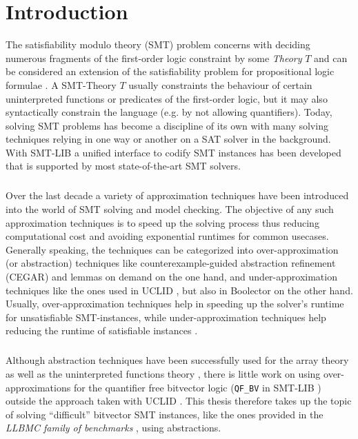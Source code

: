 \chapter{Introduction}
\label{ch:introduction}
The satisfiability modulo theory (SMT) problem concerns with deciding numerous fragments of the first-order logic constraint by some \textit{Theory} $T$ \cite{Barrett-Tinelli-SMT} and can be considered an extension of the satisfiability problem for propositional logic formulae \cite{Marques-Silva-PropositionalSATSolving}.
A SMT-Theory $T$ usually constraints the behaviour of certain uninterpreted functions or predicates of the first-order logic, but it may also syntactically constrain the language (e.g. by not allowing quantifiers).
Today, solving SMT problems has become a discipline of its own with many solving techniques relying in one way or another on a SAT solver in the background.
With SMT-LIB \cite{BarFT-SMTLIB} a unified interface to codify SMT instances has been developed that is supported by most state-of-the-art SMT solvers.
\paragraph{}
Over the last decade a variety of approximation techniques have been introduced into the world of SMT solving and model checking.
The objective of any such approximation techniques is to speed up the solving process thus reducing computational cost and avoiding exponential runtimes for common usecases.
Generally speaking, the techniques can be categorized into over-approximation (or abstraction) techniques like counterexample-guided abstraction refinement (CEGAR) \cite{CEGAR} and lemmas on demand \cite{p6-brummayer} on the one hand, and under-approximation techniques like the ones used in UCLID \cite{Bryant2007_Chapter_DecidingBit-VectorArithmeticWi-UCLID}, but also in Boolector \cite{NiemetzPreinerBiere-JSAT15} on the other hand.
Usually, over-approximation techniques help in speeding up the solver's runtime for unsatisfiable SMT-instances, while under-approximation techniques help reducing the runtime of satisfiable instances \cite{Brummayer-PhD}. 
\paragraph{}
Although abstraction techniques have been successfully used for the array theory \cite{p6-brummayer} as well as the uninterpreted functions theory \cite{PreinerNiemetzBiere-DIFTS13,NiemetzPreinerBiere-FMCAD14}, there is little work on using over-approximations for the quantifier free bitvector logic (\texttt{QF\_BV} in SMT-LIB \cite{BarFT-SMTLIB}) outside the approach taken with UCLID \cite{Bryant2007_Chapter_DecidingBit-VectorArithmeticWi-UCLID}.
This thesis therefore takes up the topic of solving \enquote{difficult} bitvector SMT instances, like the ones provided in the \textit{LLBMC family of benchmarks} \cite{sc2017-proceedings}, using abstractions.

